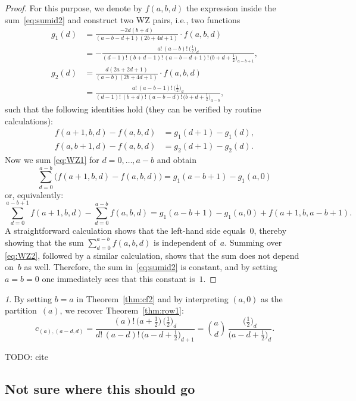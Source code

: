 \documentclass[10pt,oneside,american]{amsart}
\numberwithin{equation}{section}
\numberwithin{figure}{section}
\theoremstyle{plain}
\theoremstyle{definition}
\theoremstyle{remark}
\newtheorem{rem}[thm]{\protect\remarkname}
\theoremstyle{plain}
\theoremstyle{definition}
\theoremstyle{plain}
\theoremstyle{plain}
\providecommand{\remarkname}{Remark}
\begin{document}
\begin{proof}
  For this purpose, we denote by $f(a,b,d)$ the expression inside the
  sum~\eqref{eq:sumid2} and construct two WZ pairs, i.e., two functions
  \begin{align*}
    g_1(d) &= \frac{-2d(b+d)}{(a-b-d+1)(2b+4d+1)}\cdot f(a,b,d) \\
    &= -\frac{a! \, (a-b)! \, \bigl(\frac12\bigr)_{\!d}}{(d-1)! \, (b+d-1)! \, (a-b-d+1)! \, \bigl(b+d+\frac12\bigr)_{\!a-b+1}}, \\
    g_2(d) &= \frac{d(2a+2d+1)}{(a-b)(2b+4d+1)} \cdot f(a,b,d) \\
    &= \frac{a! \, (a-b-1)! \, \bigl(\frac12\bigr)_{\!d}}{(d-1)! \, (b+d)! \, (a-b-d)! \, \bigl(b+d+\frac12\bigr)_{\!a-b}},
  \end{align*}
  such that the following identities hold (they can be verified by routine
  calculations):
  \begin{align}
    f(a+1,b,d)-f(a,b,d) &= g_1(d+1) - g_1(d), \label{eq:WZ1} \\
    f(a,b+1,d)-f(a,b,d) &= g_2(d+1) - g_2(d). \label{eq:WZ2}
  \end{align}
  Now we sum \eqref{eq:WZ1} for $d=0,\dots,a-b$ and obtain
  \[
    \sum_{d=0}^{a-b}\bigl(f(a+1,b,d)-f(a,b,d)\bigr) = g_1(a-b+1) - g_1(a,0)
  \]
  or, equivalently:
  \[
    \sum_{d=0}^{a-b+1}f(a+1,b,d) - \sum_{d=0}^{a-b}f(a,b,d) = g_1(a-b+1) - g_1(a,0) + f(a+1,b,a-b+1).
  \]
  A straightforward calculation shows that the left-hand side equals~$0$,
  thereby showing that the sum $\sum_{d=0}^{a-b}f(a,b,d)$ is independent
  of~$a$. Summing over \eqref{eq:WZ2}, followed by a similar calculation,
  shows that the sum does not depend on~$b$ as well. Therefore, the sum
  in~\eqref{eq:sumid2} is constant, and by setting $a=b=0$ one immediately
  sees that this constant is~$1$.
\end{proof}

\begin{rem}
  By setting $b=a$ in Theorem~\ref{thm:cf2} and by interpreting $(a,0)$ as the
  partition~$(a)$, we recover Theorem~\ref{thm:row1}:
  \[
    c_{(a),(a-d,d)} = 
    \frac{(a)! \, \bigl(a+\frac12\bigr) \, \bigl(\frac12\bigr)_{\!d}}
         {d! \, (a-d)! \, \bigl(a-d+\frac12\bigr)_{\!d+1}} =
    \binom{a}{d} \, \frac{\bigl(\frac12\bigr)_{\!d}}{\bigl(a-d+\frac12\bigr)_{\!d}}.
  \]
\end{rem}

TODO: cite \cite{Moakher}

\subsection{Not sure where this should go}
\end{document}
